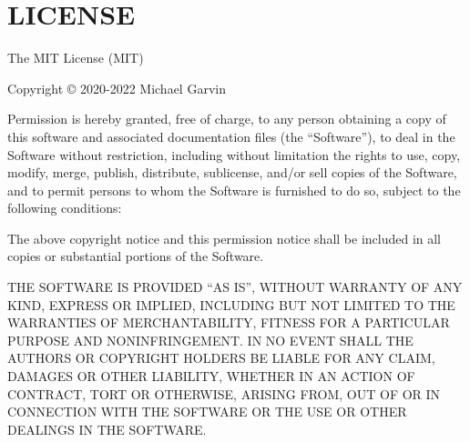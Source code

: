 \chapter{LICENSE}
\hypertarget{md_backend_2node__modules_2_0dgar_2promisify_2_l_i_c_e_n_s_e}{}\label{md_backend_2node__modules_2_0dgar_2promisify_2_l_i_c_e_n_s_e}
The MIT License (MIT)

Copyright © 2020-\/2022 Michael Garvin

Permission is hereby granted, free of charge, to any person obtaining a copy of this software and associated documentation files (the “\+Software”), to deal in the Software without restriction, including without limitation the rights to use, copy, modify, merge, publish, distribute, sublicense, and/or sell copies of the Software, and to permit persons to whom the Software is furnished to do so, subject to the following conditions\+:

The above copyright notice and this permission notice shall be included in all copies or substantial portions of the Software.

THE SOFTWARE IS PROVIDED “\+AS IS”, WITHOUT WARRANTY OF ANY KIND, EXPRESS OR IMPLIED, INCLUDING BUT NOT LIMITED TO THE WARRANTIES OF MERCHANTABILITY, FITNESS FOR A PARTICULAR PURPOSE AND NONINFRINGEMENT. IN NO EVENT SHALL THE AUTHORS OR COPYRIGHT HOLDERS BE LIABLE FOR ANY CLAIM, DAMAGES OR OTHER LIABILITY, WHETHER IN AN ACTION OF CONTRACT, TORT OR OTHERWISE, ARISING FROM, OUT OF OR IN CONNECTION WITH THE SOFTWARE OR THE USE OR OTHER DEALINGS IN THE SOFTWARE. 